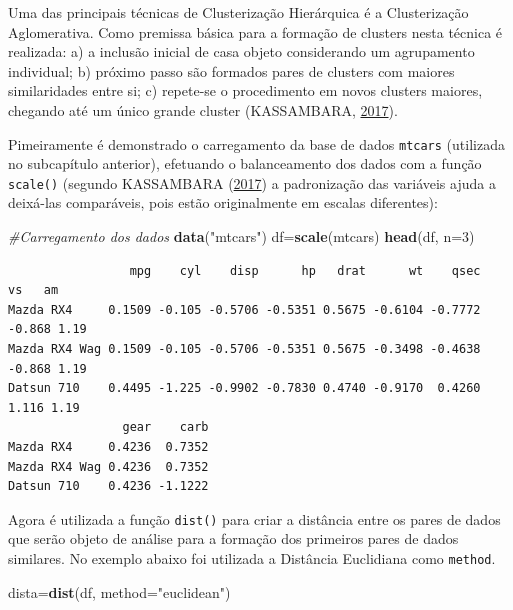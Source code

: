 \documentclass[12pt,brazil,oneside]{book}
\newenvironment{Shaded}{\begin{snugshade}}{\end{snugshade}}
\newcommand{\CommentTok}[1]{\textcolor[rgb]{0.56,0.35,0.01}{\textit{#1}}}
\newcommand{\DataTypeTok}[1]{\textcolor[rgb]{0.13,0.29,0.53}{#1}}
\newcommand{\DecValTok}[1]{\textcolor[rgb]{0.00,0.00,0.81}{#1}}
\newcommand{\KeywordTok}[1]{\textcolor[rgb]{0.13,0.29,0.53}{\textbf{#1}}}
\newcommand{\NormalTok}[1]{#1}
\newcommand{\StringTok}[1]{\textcolor[rgb]{0.31,0.60,0.02}{#1}}
\begin{document}
Uma das principais técnicas de Clusterização Hierárquica é a Clusterização Aglomerativa. Como premissa básica para a formação de clusters nesta técnica é realizada: a) a inclusão inicial de casa objeto considerando um agrupamento individual; b) próximo passo são formados pares de clusters com maiores similaridades entre si; c) repete-se o procedimento em novos clusters maiores, chegando até um único grande cluster (KASSAMBARA, \protect\hyperlink{ref-Kassambara2017}{2017}).

Pimeiramente é demonstrado o carregamento da base de dados \texttt{mtcars} (utilizada no subcapítulo anterior), efetuando o balanceamento dos dados com a função \texttt{scale()} (segundo KASSAMBARA (\protect\hyperlink{ref-Kassambara2017}{2017}) a padronização das variáveis ajuda a deixá-las comparáveis, pois estão originalmente em escalas diferentes):

\begin{Shaded}
\begin{Highlighting}[]
\CommentTok{#Carregamento dos dados}
\KeywordTok{data}\NormalTok{(}\StringTok{"mtcars"}\NormalTok{)}
\NormalTok{df=}\KeywordTok{scale}\NormalTok{(mtcars)}
\KeywordTok{head}\NormalTok{(df, }\DataTypeTok{n=}\DecValTok{3}\NormalTok{)}
\end{Highlighting}
\end{Shaded}

\begin{verbatim}
                 mpg    cyl    disp      hp   drat      wt    qsec     vs   am
Mazda RX4     0.1509 -0.105 -0.5706 -0.5351 0.5675 -0.6104 -0.7772 -0.868 1.19
Mazda RX4 Wag 0.1509 -0.105 -0.5706 -0.5351 0.5675 -0.3498 -0.4638 -0.868 1.19
Datsun 710    0.4495 -1.225 -0.9902 -0.7830 0.4740 -0.9170  0.4260  1.116 1.19
                gear    carb
Mazda RX4     0.4236  0.7352
Mazda RX4 Wag 0.4236  0.7352
Datsun 710    0.4236 -1.1222
\end{verbatim}

Agora é utilizada a função \texttt{dist()} para criar a distância entre os pares de dados que serão objeto de análise para a formação dos primeiros pares de dados similares. No exemplo abaixo foi utilizada a Distância Euclidiana como \texttt{method}.

\begin{Shaded}
\begin{Highlighting}[]
\NormalTok{dista=}\KeywordTok{dist}\NormalTok{(df, }\DataTypeTok{method=}\StringTok{"euclidean"}\NormalTok{)}
\end{Highlighting}
\end{Shaded}
\end{document}

